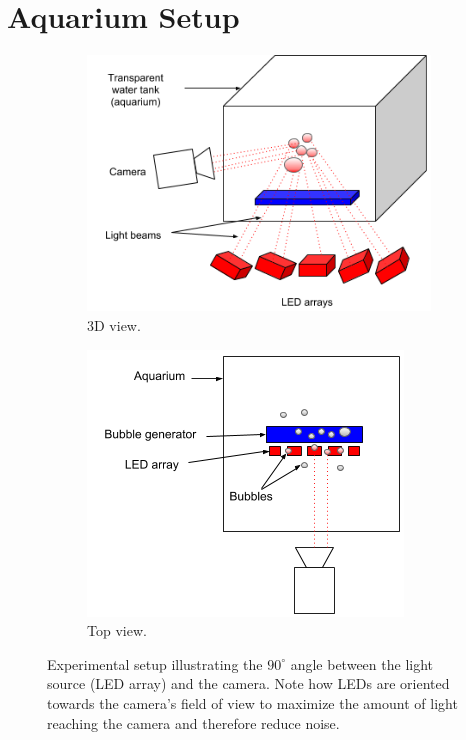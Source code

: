 	
		
	\section{Aquarium Setup}\label{aquarium_setup}
		\begin{figure}
			\begin{subfigure}[t]{.5\textwidth}
				\includegraphics[scale=.6]{images/aquarium_setup.png}
				\caption{3D view.}
				\label{subfig:aquarium_setup_above}
			\end{subfigure}\hfill
			\begin{subfigure}[t]{.4\textwidth}
				\includegraphics[scale=.6]{images/aquarium_setup_above.png}
				\caption{Top view.}
			\end{subfigure}
			\caption{Experimental setup illustrating the $90^\circ$ angle between the light source (LED array) and the camera. Note how LEDs are oriented towards the camera's field of view to maximize the amount of light reaching the camera and therefore reduce noise.}
			\label{fig:aquarium_setup}
		\end{figure}			
		
